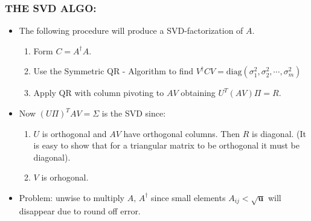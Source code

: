\documentclass[a4paper,8pt]{beamer} %
\newcommand{\ts}[1]{\textbf{#1}}
\newcommand{\diag}[1]{\text{diag}{#1}}
\begin{document}
\begin{frame}
\frametitle{THE SVD ALGO:}
\begin{itemize}
	\item The following procedure will produce a SVD-factorization of $A$. 
		\begin{enumerate}
			\item Form $C=A^\dagger A$.
			\item Use the Symmetric QR - Algorithm to find 
				$V^\dagger CV = \diag{(\sigma_{1}^2,\sigma_{2}^2,\cdots,\sigma_{m}^2)}$
			\item Apply QR with column pivoting to $AV$  obtaining $U^T(AV)\Pi=R$.
		\end{enumerate}
	\item Now  $(U\Pi)^T A V = \Sigma$ is the SVD since:
		\begin{enumerate}
			\item $U$ is orthogonal and $AV$ have orthogonal columns. Then $R$ is diagonal.  
				(It is easy to show that for a triangular matrix to be orthogonal it must be diagonal).
			\item $V$ is orhogonal.
		\end{enumerate}
	\item Problem: unwise to multiply $A,\,A^\dagger$ since small elements  
		$A_{ij}<\sqrt{\ts u}$ will disappear due to round off error.
\end{itemize}
\end{frame}



\end{document}
